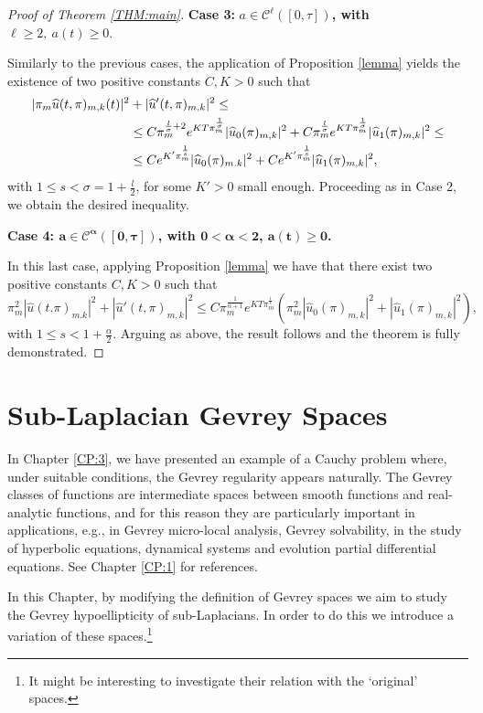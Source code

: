\documentclass[12pt,oneside,a4paper]{book}
\numberwithin{equation}{section}     %
\theoremstyle{plain}
\theoremstyle{definition}
\begin{document}
\begin{proof}[Proof of Theorem \ref{THM:main}]
	\medskip
\textbf{Case 3:} $a\in\mathcal C^\ell([0,\tau])$\textbf{, with} $\ell\geq 2,~a(t)\geq 0.$
	
	Similarly to the previous cases, the application of Proposition \ref{lemma} yields the existence of two positive constants $C,K>0$ such that
	\begin{align*}
	|\pi_m \widehat{u}(t,\pi)_{m,k}(t)|^2&+|\widehat{u}'(t,\pi)_{m,k}|^2\leq\\
	&\leq C\pi_m^{\frac{l}{\sigma}+2}e^{KT\pi_m^\frac{1}{\sigma}}| \widehat{u}_0(\pi)_{m,k}|^2+C\pi_m^\frac{l}{\sigma}e^{KT\pi_m^\frac{1}{\sigma}}|\widehat{u}_1(\pi)_{m,k}|^2\leq\\\notag
	&\leq Ce^{K'\pi_m^\frac{1}{s}}| \widehat{u}_0(\pi)_{m.k}|^2+Ce^{K'\pi_m^\frac{1}{s}}|\widehat{u}_1(\pi)_{m,k}|^2,
	\end{align*}
	with $1\leq s<\sigma=1+\frac{l}{2}$, for some $K'>0$ small enough. Proceeding as in Case 2, we obtain the desired inequality.
	
	\medskip
	\textbf{Case 4: $\mathbf{a\in\mathcal C^\alpha([0,\tau])}$, with $\mathbf{0<\alpha<2}$, $\mathbf{a(t)\geq0}$.}
	
	In this last case, applying Proposition \ref{lemma} we have that there exist two positive constants $C,K>0$ such that 
	\[
	\pi_m^2|\widehat{u}(t.\pi)_{m.k}|^2+|\widehat{u}'(t,\pi)_{m,k}|^2\leq C\pi_m^\frac{1}{\alpha+1}e^{KT\pi_m^\frac{1}{s}}(\pi_m^2|\widehat{u}_0(\pi)_{m,k}|^2+|\widehat{u}_1(\pi)_{m,k}|^2),
	\]
	with $1\leq s< 1+\frac\alpha{2}$. Arguing as above, the result follows and the theorem is fully demonstrated.
\end{proof}


\chapter{Sub-Laplacian Gevrey Spaces}\label{CP:4}
In Chapter \ref{CP:3}, we have presented an example of a Cauchy problem where, under suitable conditions, the Gevrey regularity appears naturally. The Gevrey classes of functions are intermediate spaces between smooth functions and real-analytic functions, and for this reason they are particularly important in applications, e.g., in Gevrey micro-local analysis, Gevrey solvability, in the study of hyperbolic equations, dynamical systems and evolution partial differential equations. See Chapter \ref{CP:1} for references. 

In this Chapter, by modifying the definition of Gevrey spaces we aim to study the Gevrey hypoellipticity of sub-Laplacians. In order to do this we introduce a variation of these spaces.\footnote{It might be interesting to investigate their relation with the `original' spaces.}
\end{document}
